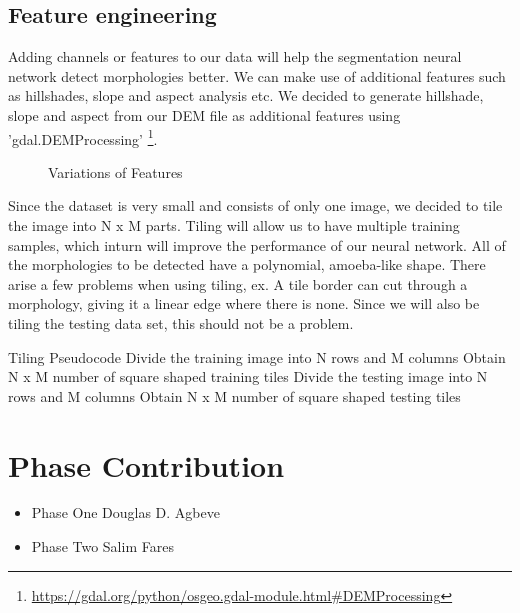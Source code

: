 \documentclass[sigconf,natbib=false]{acmart}
\begin{document}
\subsection{Feature engineering}
Adding channels or features to our data will help the segmentation neural network detect morphologies better. We can make use of additional features such as hillshades, slope and aspect analysis etc. We decided to generate hillshade, slope and aspect from our DEM file as additional features using 'gdal.DEMProcessing'
\footnote{\url{https://gdal.org/python/osgeo.gdal-module.html\#DEMProcessing}}.
\begin{figure}[ht]
    \centering
    \caption{Variations of Features}
\end{figure}
Since the dataset is very small and consists of only one image, we decided to tile the image into N x M parts. Tiling will allow us to have multiple training samples, which inturn will improve the performance of our neural network. All of the morphologies to be detected have a polynomial, amoeba-like shape. There arise a few problems when using tiling, ex. A tile border can cut through a morphology, giving it a linear edge where there is none. Since we will also be tiling the testing data set, this should not be a problem.

Tiling Pseudocode
Divide the training image into N rows and  M columns
Obtain N x M number of square shaped training tiles
Divide the testing image into N rows and  M columns
Obtain N x M number of square shaped testing tiles


\printbibliography{}
\appendix
\section{Phase Contribution}
\begin{itemize}
    \item Phase One \hspace{2em} Douglas D. Agbeve
    \item Phase Two \hspace{2em} Salim Fares 
\end{itemize}
\end{document}
